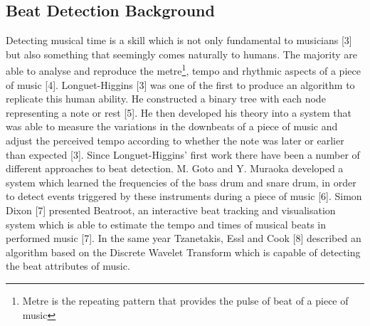 \documentclass[a4paper, 11pt]{article}
\begin{document}
\subsection{Beat Detection Background}

Detecting musical time is a skill which is not only fundamental to musicians [3] but also something that seemingly comes naturally to humans. The majority are able to analyse and reproduce the metre\footnote{Metre is the repeating pattern that provides the pulse of beat of a piece of music}, tempo and rhythmic aspects of a piece of music [4]. Longuet-Higgins [3] was one of the first to produce an algorithm to replicate this human ability. He constructed a binary tree with each node representing a note or rest [5]. He then developed his theory into a system that was able to measure the variations in the downbeats of a piece of music and adjust the perceived tempo according to whether the note was later or earlier than expected [3]. Since Longuet-Higgins' first work there have been a number of different approaches to beat detection. M. Goto and Y. Muraoka developed a system which learned the frequencies of the bass drum and snare drum, in order to detect events triggered by these instruments during a piece of music [6]. Simon Dixon [7] presented Beatroot, an interactive beat tracking and visualisation system which is able to estimate the tempo and times of musical beats in performed music [7]. In the same year Tzanetakis, Essl and Cook [8] described an algorithm based on the Discrete Wavelet Transform which is capable of detecting the beat attributes of music. 


\end{document}

